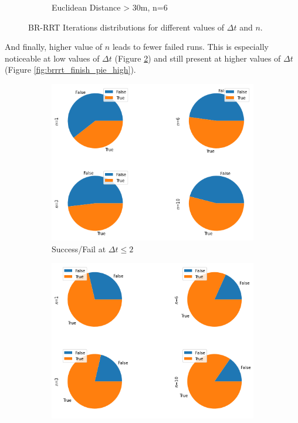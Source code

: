 \documentclass[a4paper,12pt]{article}
\DeclareRobustCommand{\[}{\begin{equation}}
\DeclareRobustCommand{\]}{\end{equation}}
\numberwithin{equation}{section}
\numberwithin{algorithm}{section}
\begin{document}
\begin{figure}[H]
\begin{subfigure}[b]{0.6\textwidth}
        \caption{Euclidean Distance > 30m, n=6}
    \end{subfigure}
    \caption{BR-RRT Iterations distributions for different values of $\Delta{t}$ and $n$.}
    \label{fig:brrrt_iters_high}
\end{figure}

And finally, higher value of $n$ leads to fewer failed runs. This is especially noticeable at low values of $\Delta{t}$ (Figure \ref{fig:brrrt_finish_pie_low})
and still present at higher values of $\Delta{t}$ (Figure \ref{fig:brrrt_finish_pie_high}).

\begin{figure}[H]
\centering
    \begin{subfigure}[b]{0.8\textwidth}
        \includegraphics[scale=1.3,width=\textwidth]{images/brrrt_finish_pie_low_edge.png}
        \caption{Success/Fail at $\Delta{t}\leq 2$}
        \label{fig:brrrt_finish_pie_low}
    \end{subfigure}
    \begin{subfigure}[b]{0.8\textwidth}
        \includegraphics[scale=1.3,width=\textwidth]{images/brrrt_finish_pie_high_edge.png}

\end{subfigure}
\end{figure}
\end{document}
